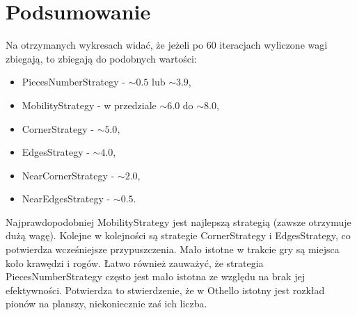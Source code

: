 \section{Podsumowanie} 

Na otrzymanych wykresach widać, że jeżeli po 60 iteracjach wyliczone wagi zbiegają, to zbiegają do podobnych wartości:
 \begin{itemize}
 \item PiecesNumberStrategy - $\sim0.5$ lub $\sim3.9$,
 \item MobilityStrategy - w przedziale $\sim6.0$ do $\sim8.0$,
 \item CornerStrategy - $\sim5.0$,
 \item EdgesStrategy - $\sim4.0$,
 \item NearCornerStrategy - $\sim2.0$,
 \item NearEdgesStrategy - $\sim0.5$.
\end{itemize}

Najprawdopodobniej MobilityStrategy jest najlepszą strategią (zawsze otrzymuje dużą wagę). Kolejne w kolejności są strategie CornerStrategy i EdgesStrategy, co potwierdza wcześniejsze przypuszczenia. Mało istotne w trakcie gry są miejsca koło krawędzi i rogów. Łatwo również zauważyć, że strategia PiecesNumberStrategy często jest mało istotna ze względu na brak jej efektywności. Potwierdza to stwierdzenie, że w Othello istotny jest rozkład pionów na planszy, niekoniecznie zaś ich liczba.